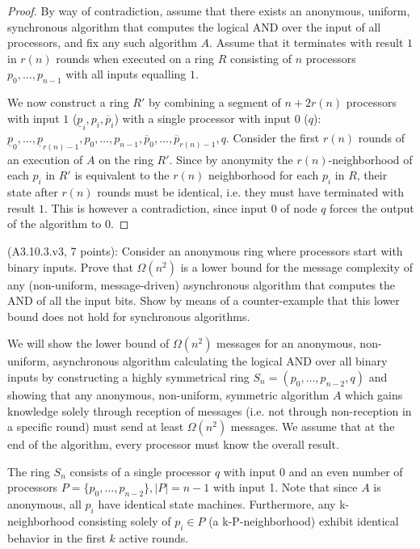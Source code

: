\begin{proof}
By way of contradiction, assume that there exists an anonymous, uniform,
synchronous algorithm that computes the logical AND over the input of
all processors, and fix any such algorithm $A$.
Assume that it terminates with result $1$ in $r(n)$ rounds when executed on a ring $R$ consisting
of $n$ processors $p_0, \ldots, p_{n-1}$ with all inputs equalling $1$.

We now construct a ring $R'$ by combining a segment of $n + 2r(n)$ processors with input $1$
($\underline{p}_i, p_i, \overline{p}_i$) with a single processor with input $0$ ($q$):
$\underline{p}_0, \ldots, \underline{p}_{r(n) - 1},
 p_0, \ldots, p_{n-1},
 \overline{p}_0, \ldots, \overline{p}_{r(n) - 1},
 q.$
Consider the first $r(n)$ rounds of an execution of $A$ on the ring $R'$. Since by anonymity
the $r(n)$-neighborhood
of each $p_i$ in $R'$ is equivalent to the $r(n)$ neighborhood for each $p_i$ in $R$, their state
after $r(n)$ rounds must be identical, i.e. they must have terminated with result $1$. This is however
a contradiction, since input $0$ of node $q$ forces the output of the algorithm to $0$.
\end{proof}


\begin{Exc}{(A3.10.3.v3, 7 points):}
Consider an anonymous ring where processors start with binary
inputs. Prove that $\Omega(n^2)$ is a lower bound for the
message complexity of any (non-uniform, message-driven)
asynchronous algorithm that computes the AND of all the
input bits. Show by means of a counter-example that this
lower bound does not hold for synchronous algorithms.
\end{Exc}

We will show the lower bound of $\Omega(n^2)$ messages for an anonymous, non-uniform,
asynchronous algorithm calculating the logical AND over all binary inputs by
constructing a highly symmetrical ring $S_n = (p_0, \ldots, p_{n-2}, q)$ and showing
that any anonymous, non-uniform, symmetric algorithm $A$ which gains knowledge solely
through reception of messages (i.e. not through non-reception in a specific round)
must send at least $\Omega(n^2)$ messages.
We assume
that at the end of the algorithm, every processor must know the overall result.

The ring $S_n$ consists of a single processor $q$ with input 0 and an even number of processors 
$P = \{ p_0, \ldots, p_{n-2} \}, |P| = n - 1$ with input 1. Note that since $A$ is anonymous, all $p_i$
have identical state machines. Furthermore, any k-neighborhood consisting solely
of $p_i \in P$ (a k-P-neighborhood) exhibit identical behavior in the first $k$ active rounds.

